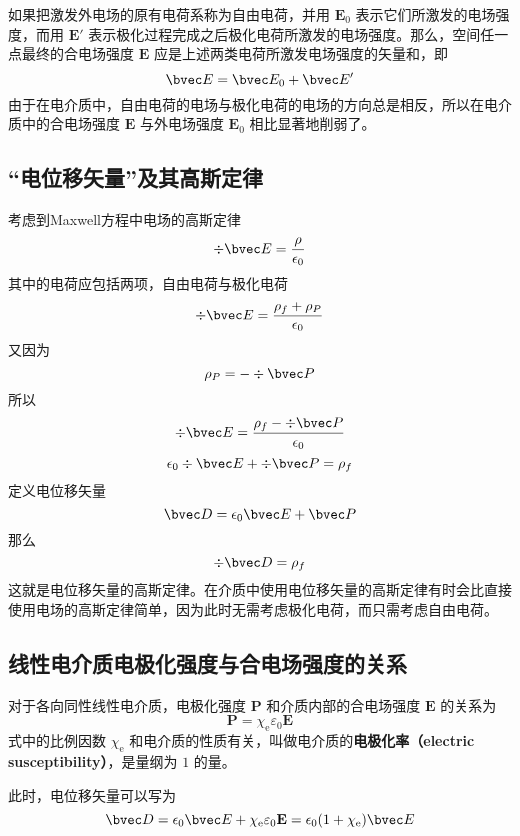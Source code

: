 

如果把激发外电场的原有电荷系称为自由电荷，并用 $\mathbf E_0$ 表示它们所激发的电场强度，而用 $\mathbf E'$ 表示极化过程完成之后极化电荷所激发的电场强度。那么，空间任一点最终的合电场强度 $\mathbf E $ 应是上述两类电荷所激发电场强度的矢量和，即
\begin{equation}
\bvec E = \bvec E_{0} + \bvec E'
\end{equation}
由于在电介质中，自由电荷的电场与极化电荷的电场的方向总是相反，所以在电介质中的合电场强度 $\mathbf E $ 与外电场强度 $\mathbf E_0$ 相比显著地削弱了。
\subsection{“电位移矢量”及其高斯定律}
考虑到Maxwell方程中电场的高斯定律
$$\div \bvec E = \frac{\rho}{\epsilon_0}$$
其中的电荷应包括两项，自由电荷与极化电荷
$$\div \bvec E = \frac{\rho_f+\rho_P}{\epsilon_0}$$
又因为
$$\rho_P=-\div \bvec P$$
所以
$$\div \bvec E = \frac{\rho_f-\div \bvec P}{\epsilon_0}$$
$$\epsilon_0 \div \bvec E + \div \bvec P= \rho_f$$
定义电位移矢量 
\begin{equation}
\bvec D = \epsilon_0 \bvec E + \bvec P
\end{equation}
那么
\begin{equation}
\div \bvec D = \rho_f
\end{equation}
这就是电位移矢量的高斯定律。在介质中使用电位移矢量的高斯定律有时会比直接使用电场的高斯定律简单，因为此时无需考虑极化电荷，而只需考虑自由电荷。

\subsection{线性电介质电极化强度与合电场强度的关系}
对于各向同性线性电介质，电极化强度 $\mathbf P $ 和介质内部的合电场强度 $\mathbf E $ 的关系为%
\begin{equation} 
\mathbf P=\chi_{\mathrm e} \varepsilon_{0} \mathbf E
\end{equation}
式中的比例因数 $\chi_{\mathrm{e}}$ 和电介质的性质有关，叫做电介质的\textbf{电极化率（electric susceptibility）}，是量纲为 $1 $ 的量。

此时，电位移矢量可以写为
$$
\bvec D = \epsilon_0 \bvec E + \chi_{\mathrm e} \varepsilon_{0} \mathbf E
= \epsilon_0(1+\chi_{\mathrm e}) \bvec E
$$

